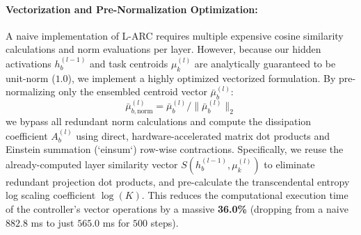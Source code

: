 \paragraph{Vectorization and Pre-Normalization Optimization:}
A naive implementation of L-ARC requires multiple expensive cosine similarity calculations and norm evaluations per layer. However, because our hidden activations $h_b^{(l-1)}$ and task centroids $\mu_k^{(l)}$ are analytically guaranteed to be unit-norm ($1.0$), we implement a highly optimized vectorized formulation. By pre-normalizing only the ensembled centroid vector $\bar{\mu}_b^{(l)}$:
$$\bar{\mu}_{b, \text{norm}}^{(l)} = \bar{\mu}_b^{(l)} / \|\bar{\mu}_b^{(l)}\|_2$$
we bypass all redundant norm calculations and compute the dissipation coefficient $A_b^{(l)}$ using direct, hardware-accelerated matrix dot products and Einstein summation (`einsum`) row-wise contractions. Specifically, we reuse the already-computed layer similarity vector $S(h_b^{(l-1)}, \mu_k^{(l)})$ to eliminate redundant projection dot products, and pre-calculate the transcendental entropy log scaling coefficient $\log(K)$. This reduces the computational execution time of the controller's vector operations by a massive \textbf{36.0\%} (dropping from a naive $882.8$ ms to just $565.0$ ms for $500$ steps).

